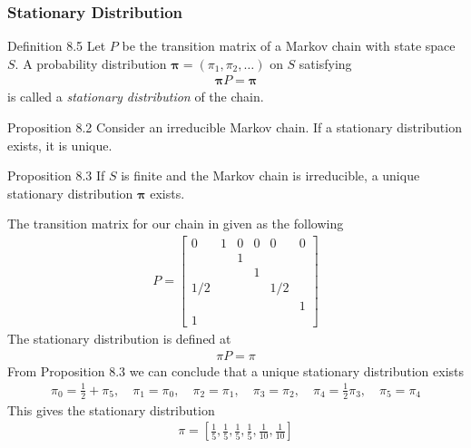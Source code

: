 \subsubsection{Stationary Distribution}
\begin{boks}{Definition 8.5}
  Let $P$ be the transition matrix of a Markov chain with state space $S$. A probability distribution $\boldsymbol{\pi} = (\pi_1, \pi_2, \ldots)$ on $S$ satisfying
  \begin{align*}
    \boldsymbol{\pi} P = \boldsymbol{\pi}
  \end{align*}
  is called a \textit{stationary distribution} of the chain.
\end{boks}
\begin{boks}{Proposition 8.2}
  Consider an irreducible Markov chain. If a stationary distribution exists, it is unique.
\end{boks}
\begin{boks}{Proposition 8.3}
  If $S$ is finite and the Markov chain is irreducible, a unique stationary distribution $\boldsymbol{\pi}$ exists.
\end{boks}
The transition matrix for our chain in given as the following
\begin{align*}
  P =
  \begin{bmatrix}
      0 & 1 & 0 & 0 & 0 & 0  \\
        &   & 1 &   &     &  \\
        &   &   & 1 &     &  \\
    1/2 &   &   &   & 1/2 &  \\
        &   &   &   &     &1 \\
    1   &   &   &   &     &
  \end{bmatrix}
\end{align*}
The stationary distribution is defined at
\begin{align*}
  \pi P = \pi
\end{align*}
From Proposition 8.3 we can conclude that a unique stationary distribution exists
\begin{align*}
  \pi_0 = \frac{1}{2} + \pi_5, \quad
  \pi_1 = \pi_0, \quad
  \pi_2 = \pi_1, \quad
  \pi_3 = \pi_2, \quad
  \pi_4 = \frac{1}{2} \pi_3, \quad
  \pi_5 = \pi_4
\end{align*}
This gives the stationary distribution
\begin{align*}
  \pi = \left[\frac{1}{5}, \frac{1}{5}, \frac{1}{5}, \frac{1}{5}, \frac{1}{10}, \frac{1}{10}\right]
\end{align*}
